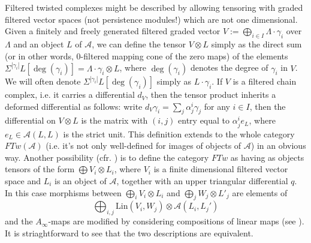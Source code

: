 \begin{rem}
	Filtered twisted complexes might be described by allowing tensoring with graded filtered vector spaces (not persistence modules!) which are not one dimensional. Given a finitely and freely generated filtered graded vector $V := \bigoplus_{i\in I}\Lambda\cdot \gamma_i$ over $\Lambda$ and an object $L$ of $\mathcal{A}$, we can define the tensor $V\otimes L$ simply as the direct sum (or in other words, $0$-filtered mapping cone of the zero maps) of the elements $\Sigma^{|\gamma_i|}L[\deg(\gamma_i)] = \Lambda\cdot \gamma_i\otimes L$, where $\deg(\gamma_i)$ denotes the degree of $\gamma_i$ in $V$. We will often denote $\Sigma^{|\gamma_i|}L[\deg(\gamma_i)]$ simply as $L\cdot \gamma_i$. If $V$ is a filtered chain complex, i.e. it carries a differential $d_V$, then the tensor product inherits a deformed differential as follows: write $d_V\gamma_i = \sum_j\alpha^i_j\gamma_j$ for any $i\in I$, then the differential on $V\otimes L$ is the matrix with $(i,j)$ entry equal to $\alpha^i_je_L$, where $e_L\in \mathcal{A}(L,L)$ is the strict unit. This definition extends to the whole category $FTw(\mathcal{A})$ (i.e. it's not only well-defined for images of objects of $\mathcal{A}$) in an obvious way.  Another possibility (cfr. \cite[Section (3l)]{Se:book-fukaya-categ}) is to define the category $FTw$ as having as objects tensors of the form $\bigoplus V_i\otimes L_i$, where $V_i$ is a finite dimensional filtered vector space and $L_i$ is an object of $\mathcal{A}$, together with an upper triangular differential $q$. In this case morphisms between $\bigoplus_i V_i\otimes L_i$ and $\bigoplus_j W_j\otimes L'_j$ are elements of $$\bigoplus_{i,j}\text{Lin}(V_i,W_j)\otimes \mathcal{A}(L_i,L_j')$$ and the $A_\infty$-maps are modified by considering compositions of linear maps (see \cite[Equation (3.17)]{Se:book-fukaya-categ}). It is striaghtforward to see that the two descriptions are equivalent.
\end{rem}


